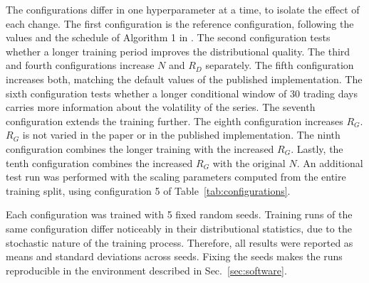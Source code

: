 The configurations differ in one hyperparameter at a time, to isolate the effect of each change.
The first configuration is the reference configuration, following the values and the schedule of Algorithm 1 in \textcite{vuleticFinGANForecastingClassifying2024}. 
The second configuration tests whether a longer training period improves the distributional quality. 
The third and fourth configurations increase $N$ and $R_D$ separately. 
The fifth configuration increases both, matching the default values of the published implementation. 
The sixth configuration tests whether a longer conditional window of 30 trading days carries more information about the volatility of the series. 
The seventh configuration extends the training further. The eighth configuration increases $R_G$. $R_G$ is not varied in the paper or in the published implementation. The ninth configuration combines the longer training with the increased $R_G$. Lastly, the tenth configuration combines the increased $R_G$ with the original $N$.
An additional test run was performed with the scaling parameters computed from the entire training split, using configuration 5 of Table~\ref{tab:configurations}.

Each configuration was trained with 5 fixed random seeds. Training runs of the same configuration differ noticeably in their distributional statistics, due to the stochastic nature of the training process. Therefore, all results were reported as means and standard deviations across seeds. Fixing the seeds makes the runs reproducible in the environment described in Sec.~\ref{sec:software}.
